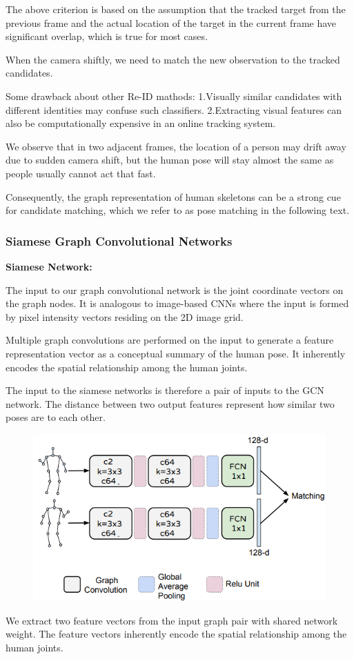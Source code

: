 \documentclass[11pt]{article}
\begin{document}
The above criterion is based on the assumption that the tracked target from the previous frame and the actual location of the target in the current frame have significant overlap, which is true for most cases.

When the camera shiftly, we need to match the new observation to the tracked candidates.

Some drawback about other Re-ID mathods: 1.Visually similar candidates with different identities may confuse such classifiers. 2.Extracting visual features can also be computationally expensive in an online tracking system.

We observe that in two adjacent frames, the location of a person may drift away due to sudden camera shift, but the human pose will stay almost the same as people usually cannot act that fast.

Consequently, the graph representation of human skeletons can be a strong cue for candidate matching, which we refer to as pose matching in the following text.
\subsubsection{Siamese Graph Convolutional Networks}
\textbf{Siamese Network:}

The input to our graph convolutional network is the joint coordinate vectors on the
graph nodes. It is analogous to image-based CNNs where the input is formed by pixel intensity vectors residing on the 2D image grid.

Multiple graph convolutions are performed on the input to generate a feature representation
vector as a conceptual summary of the human pose. It inherently encodes the spatial relationship among the human joints. 

The input to the siamese networks is therefore a pair of inputs to the GCN network. The distance between two output features represent how similar two poses are to each other.
\begin{figure}[H]
	\centering
	\includegraphics[scale = 0.6]{27}
\end{figure}
We extract two feature vectors from the input graph pair with shared network weight. The feature vectors inherently encode the spatial relationship among the human joints.
\end{document}

